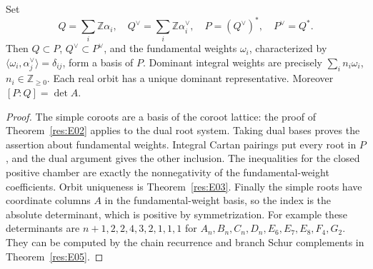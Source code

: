 \begin{proposition}\label{res:E07}
Set
\[
 Q=\sum_i\mathbb Z\alpha_i,\quad
 Q^\vee=\sum_i\mathbb Z\alpha_i^\vee,\quad
 P=(Q^\vee)^*,\quad P^\vee=Q^*.
\]
Then \(Q\subset P\), \(Q^\vee\subset P^\vee\), and
the fundamental weights \(\omega_i\), characterized by
\(\langle\omega_i,\alpha_j^\vee\rangle=\delta_{ij}\),
form a basis of \(P\).
Dominant integral weights are precisely
\(\sum_i n_i\omega_i\), \(n_i\in\mathbb Z_{\ge0}\).
Each real orbit has a unique dominant representative.
Moreover \([P:Q]=\det A\).
\end{proposition}
\begin{proof}
The simple coroots are a basis of the coroot lattice:
the proof of Theorem~\ref{res:E02} applies to the dual
root system. Taking dual bases proves the assertion about
fundamental weights. Integral Cartan pairings put every root
in \(P\), and the dual argument gives the other inclusion.
The inequalities for the closed positive chamber are
exactly the nonnegativity of the fundamental-weight
coefficients. Orbit uniqueness is Theorem~\ref{res:E03}.
Finally the simple roots have coordinate columns \(A\)
in the fundamental-weight basis, so the index is the
absolute determinant, which is positive by symmetrization.
For example these determinants are \(n+1,2,2,4,3,2,1,1,1\)
for \(A_n,B_n,C_n,D_n,E_6,E_7,E_8,F_4,G_2\).
They can be computed by the chain recurrence and branch
Schur complements in Theorem~\ref{res:E05}.
\end{proof}

